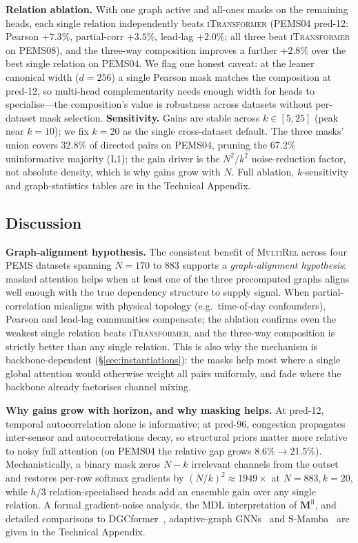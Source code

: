 \documentclass[letterpaper]{article}   %
\newcommand{\mr}{\textsc{MultiRel}}
\newcommand{\itrans}{\textsc{iTransformer}}
\begin{document}
\textbf{Relation ablation.} With one graph active and all-ones masks on the
remaining heads, each single relation independently beats \itrans{} (PEMS04 pred-12:
Pearson $+7.3\%$, partial-corr $+3.5\%$, lead-lag $+2.0\%$; all three beat \itrans{}
on PEMS08), and the three-way composition improves a further $+2.8\%$ over the best
single relation on PEMS04. We flag one honest caveat: at the leaner canonical width
($d{=}256$) a single Pearson mask matches the composition at pred-12, so
multi-head complementarity needs enough width for heads to specialise---the
composition's value is robustness across datasets without per-dataset mask
selection. \textbf{Sensitivity.} Gains are stable across $k\in[5,25]$ (peak near
$k{=}10$); we fix $k{=}20$ as the single cross-dataset default. The three masks'
union covers 32.8\% of directed pairs on PEMS04, pruning the 67.2\% uninformative
majority (L1); the gain driver is the $N^2/k^2$ noise-reduction factor, not absolute
density, which is why gains grow with $N$. Full ablation, $k$-sensitivity and
graph-statistics tables are in the Technical Appendix.


\subsection{Discussion}

\textbf{Graph-alignment hypothesis.}
The consistent benefit of \mr{} across four PEMS datasets spanning $N{=}170$ to $883$
supports a \emph{graph-alignment hypothesis}: masked attention helps when at least one
of the three precomputed graphs aligns well enough with the true dependency structure
to supply signal. When partial-correlation misaligns with physical topology (e.g.\
time-of-day confounders), Pearson and lead-lag communities compensate; the ablation
confirms even the weakest single relation beats \itrans{}, and the three-way composition
is strictly better than any single relation. This is also why the mechanism is
backbone-dependent (\S\ref{sec:instantiations}): the masks help most where a single
global attention would otherwise weight all pairs uniformly, and fade where the
backbone already factorises channel mixing.

\textbf{Why gains grow with horizon, and why masking helps.}
At pred-12, temporal autocorrelation alone is informative; at pred-96, congestion
propagates inter-sensor and autocorrelations decay, so structural priors matter more
relative to noisy full attention (on PEMS04 the relative gap grows 8.6\%$\to$21.5\%).
Mechanistically, a binary mask zeros $N{-}k$ irrelevant channels from the outset and
restores per-row softmax gradients by $(N/k)^2{\approx}1949\times$ at $N{=}883,k{=}20$,
while $h/3$ relation-specialised heads add an ensemble gain over any single relation. A
formal gradient-noise analysis, the MDL interpretation of $\mathbf{M}^{\mathrm{ll}}$,
and detailed comparisons to DGCformer~\cite{han2024dgcformer}, adaptive-graph
GNNs~\cite{bai2020adaptive,wu2019graph} and S-Mamba~\cite{wang2024smamba} are given in
the Technical Appendix.
\end{document}
